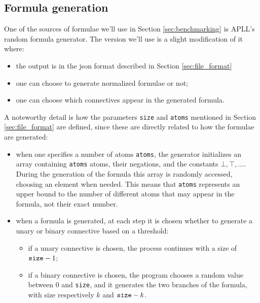 \documentclass[a4paper, 12pt, english]{report}
\begin{document}
\subsection{Formula generation}\label{sec:formula_generator}
One of the sources of formulae we'll use in Section \ref{sec:benchmarking} is APLL's random formula generator.
The version we'll use is a slight modification of it where:
\begin{itemize}
	\item the output is in the json format described in Section \ref{sec:file_format}
	\item one can choose to generate normalized formulae or not;
	\item one can choose which connectives appear in the generated formula.
\end{itemize}
A noteworthy detail is how the parameters \texttt{size} and \texttt{atoms} mentioned in Section \ref{sec:file_format} are defined, since these are directly related to how the formulae are generated:
\begin{itemize}
	\item when one specifies a number of atoms \texttt{atoms}, the generator initializes an array containing \texttt{atoms} atoms, their negations, and the constants $\bot, \top, \dots$.
		During the generation of the formula this array is randomly accessed, choosing an element when needed.
		This means that \texttt{atoms} represents an upper bound to the number of different atoms that may appear in the formula, not their exact number.
	\item when a formula is generated, at each step it is chosen whether to generate a unary or binary connective based on a threshold:
		\begin{itemize}
			\item if a unary connective is chosen, the process continues with a size of $\text{\texttt{size}} - 1$;
			\item if a binary connective is chosen, the program chooses a random value between 0 and \texttt{size}, and it generates the two branches of the formula, with size respectively $k$ and $\text{\texttt{size}} - k$.
		\end{itemize}
\end{itemize}
\end{document}
